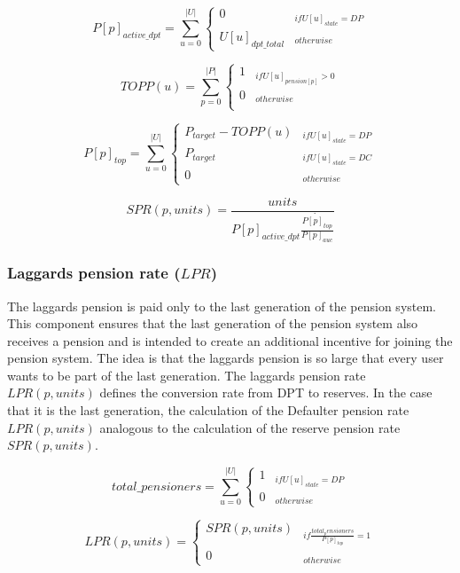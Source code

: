 \begin{equation}
P[p]_{active\_dpt} = \sum_{u=0}^{|U|} \begin{cases} 
0 & _{if U[u]_{state} = DP}\\
U[u]_{dpt\_total} & _{otherwise}
\end{cases}
\end{equation}

\begin{equation*}
TOPP(u) = \sum_{p=0}^{|P|} \begin{cases}
1 & _{if U[u]_{pension[p]} > 0}\\
0 & _{otherwise}\\
\end{cases}
\end{equation*}



\begin{equation}
P[p]_{top} = \sum_{u=0}^{|U|} \begin{cases} 
P_{target} - TOPP(u)  & _{if U[u]_{state} = DP}\\
P_{target} & _{if U[u]_{state} = DC}\\
0 & _{otherwise}
\end{cases}
\end{equation}

\begin{equation}
SPR(p, units) = \frac{units} {P[p]_{active\_dpt} \dot {\frac{P[p]_{top}} {P[p]_{auc}}}
}
\end{equation}


\subsubsection{Laggards pension rate ($LPR$)}

The laggards pension is paid only to the last generation of the pension system. This component ensures that the last generation of the pension system also receives a pension and is intended to create an additional incentive for joining the pension system. The idea is that the laggards pension is so large that every user wants to be part of the last generation. 
The laggards pension rate $LPR(p, units)$ defines the conversion rate from DPT to reserves. 
In the case that it is the last generation, the calculation of the  Defaulter pension rate $LPR(p, units)$ analogous to the calculation of the reserve pension rate $SPR(p, units)$.

\begin{equation}
total\_pensioners =  \sum_{u=0}^{|U|} \begin{cases} 
1  & _{if U[u]_{state} = DP}\\
0 & _{otherwise}
\end{cases}
\end{equation}

\begin{equation}
LPR(p, units) =  \begin{cases} 
SPR(p, units)  & _{if \frac{total_pensioners} {P[p]_{top}} = 1}\\
0 & _{otherwise}
\end{cases}
\end{equation}$  $